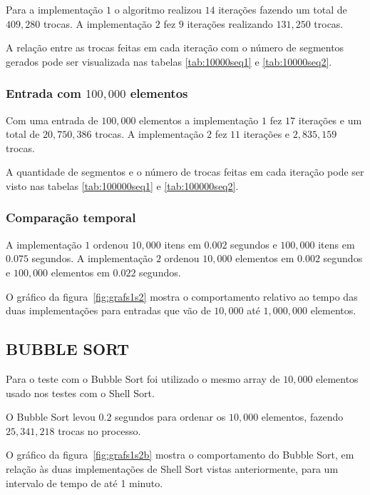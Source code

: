 \documentclass[titlepage,12pt,a4paper]{article}
\begin{document}
        Para a implementação $1$ o algoritmo realizou $14$ iterações fazendo um
        total de $409,280$ trocas. A implementação $2$ fez $9$ iterações realizando
        $131,250$ trocas.

        A relação entre as trocas feitas em cada iteração com o número de segmentos
        gerados pode ser visualizada nas tabelas \ref{tab:10000seq1} e \ref{tab:10000seq2}.

      \subsubsection{Entrada com $100,000$ elementos}

        Com uma entrada de $100,000$ elementos a implementação $1$ fez $17$ iterações
        e um total de $20,750,386$ trocas. A implementação $2$ fez $11$ iterações
        e $2,835,159$ trocas.

        A quantidade de segmentos e o número de trocas feitas em cada iteração
        pode ser visto nas tabelas \ref{tab:100000seq1} e \ref{tab:100000seq2}.

      \subsubsection{Comparação temporal}

        A implementação $1$ ordenou $10,000$ itens em $0.002$ segundos e $100,000$
        itens em $0.075$ segundos. A implementação $2$ ordenou $10,000$ elementos
        em $0.002$ segundos e $100,000$ elementos em $0.022$ segundos.

        O gráfico da figura~\ref{fig:grafs1s2} mostra o comportamento relativo ao tempo das
        duas implementações para entradas que vão de $10,000$ até $1,000,000$ elementos.

    \subsection{BUBBLE SORT}

      Para o teste com o Bubble Sort foi utilizado o mesmo array de $10,000$ elementos
      usado nos testes com o Shell Sort.

      O Bubble Sort levou $0.2$ segundos para ordenar os $10,000$ elementos, fazendo
      $25,341,218$ trocas no processo.

      O gráfico da figura~\ref{fig:grafs1s2b} mostra o comportamento do Bubble Sort, em
      relação às duas implementações de Shell Sort vistas anteriormente, para um
      intervalo de tempo de até 1 minuto.
\end{document}
